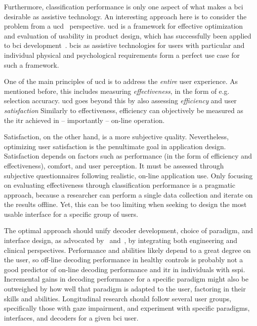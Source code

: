 Furthermore, classification performance is only one aspect of what makes a \ac{bci}
desirable as assistive technology.
An interesting approach here is to consider the problem from a
\ac{ucd}~\cite{Standardization2009} perspective.
\Ac{ucd} is a framework for effective optimization and evaluation of usability
in product design, which has successfully been applied to \ac{bci}
development~\cite{Schreuder2013,Kuebler2014,Han2022}.
\Acp{bci} as assistive technologies for users with particular and individual
physical and psychological requirements form a perfect use case for such a framework.

One of the main principles of \ac{ucd} is to address the \emph{entire} user
experience.
As mentioned before, this includes measuring \emph{effectiveness}, in the form
of e.g. selection accuracy.
\Ac{ucd} goes beyond this by also assessing \emph{efficiency} and user
\emph{satisfaction}
Similarly to effectiveness, efficiency can objectively be measured as the \ac{itr}
achieved in -- importantly -- on-line operation.

Satisfaction, on the other hand, is a more subjective quality.
Nevertheless, optimizing user satisfaction is the penultimate goal in
application design.
Satisfaction depends on factors such as performance (in the form of efficiency
and effectiveness), comfort, and user perception.
It must be assessed through subjective questionnaires following realistic, on-line
application use\cite{Kuebler2014}.
Only focusing on evaluating effectiveness through classification performance is
a pragmatic approach, because a researcher can perform a single
data collection and iterate on the results offline.
Yet, this can be too limiting when seeking to design the most usable interface
for a specific group of users.

The optimal approach should unify decoder development, choice of paradigm, and interface
design, as advocated by~\textcite{Pan2022} and~\textcite{Fouad2020}, by integrating both
engineering and clinical perspectives.
Performance and abilities likely depend to a great degree on the user,
so off-line decoding performance in healthy controls is probably not a good
predictor of on-line decoding performance and \ac{itr} in individuals with
\ac{sspi}.
Incremental gains in decoding performance for a specific paradigm might
also be outweighed by how well that paradigm is adapted to the user, factoring in
their skills and abilities.
Longitudinal research should follow several user groups, specifically those with gaze
impairment, and experiment with specific paradigms, interfaces, and decoders for
a given \ac{bci} user.

